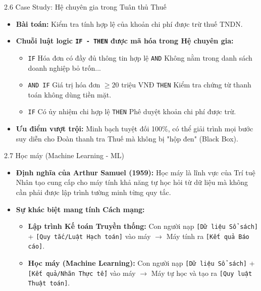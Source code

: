 \documentclass[aspectratio=169]{beamer}
\begin{document}
\begin{frame}{2.6 Case Study: Hệ chuyên gia trong Tuân thủ Thuế}
    \begin{itemize}
        \item \textbf{Bài toán:} Kiểm tra tính hợp lệ của khoản chi phí được trừ thuế TNDN.
        \item \textbf{Chuỗi luật logic \texttt{IF - THEN} được mã hóa trong Hệ chuyên gia:}
        \begin{itemize}
            \item \texttt{IF} Hóa đơn có đầy đủ thông tin hợp lệ \texttt{AND} Không nằm trong danh sách doanh nghiệp bỏ trốn...
            \item \texttt{AND IF} Giá trị hóa đơn $\ge 20$ triệu VNĐ \texttt{THEN} Kiểm tra chứng từ thanh toán không dùng tiền mặt.
            \item \texttt{IF} Có ủy nhiệm chi hợp lệ \texttt{THEN} Phê duyệt khoản chi phí được trừ.
        \end{itemize}
        \item \textbf{Ưu điểm vượt trội:} Minh bạch tuyệt đối 100\%, có thể giải trình mọi bước suy diễn cho Đoàn thanh tra Thuế mà không bị "hộp đen" (Black Box).
    \end{itemize}
\end{frame}

\begin{frame}{2.7 Học máy (Machine Learning - ML)}
    \begin{itemize}
        \item \textbf{Định nghĩa của Arthur Samuel (1959):} Học máy là lĩnh vực của Trí tuệ Nhân tạo cung cấp cho máy tính khả năng tự học hỏi từ dữ liệu mà không cần phải được lập trình tường minh từng quy tắc.
        \item \textbf{Sự khác biệt mang tính Cách mạng:}
        \begin{itemize}
            \item \textbf{Lập trình Kế toán Truyền thống:} Con người nạp \texttt{[Dữ liệu Sổ sách]} + \texttt{[Quy tắc/Luật Hạch toán]} vào máy $\rightarrow$ Máy tính ra \texttt{[Kết quả Báo cáo]}.
            \item \textbf{Học máy (Machine Learning):} Con người nạp \texttt{[Dữ liệu Sổ sách]} + \texttt{[Kết quả/Nhãn Thực tế]} vào máy $\rightarrow$ Máy tự học và tạo ra \texttt{[Quy luật Thuật toán]}.
        \end{itemize}
    \end{itemize}
\end{frame}
\end{document}
